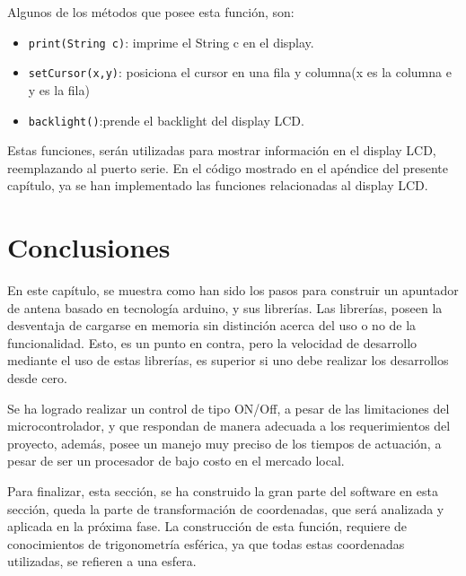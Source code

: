 Algunos de los métodos que posee esta función, son: 
\begin{itemize}
	\item \texttt{print(String c)}: imprime el String c en el display. 
	\item \texttt{setCursor(x,y)}: posiciona el cursor en una fila y columna(x es la columna e y es la fila) 
	\item \texttt{backlight()}:prende el backlight del display LCD.   
\end{itemize}

Estas funciones, serán utilizadas para mostrar información en el display LCD, reemplazando al puerto serie. En el código mostrado en el apéndice del presente capítulo, ya se han implementado las funciones relacionadas al display LCD. 


\section{Conclusiones}


En este capítulo, se muestra como han sido los pasos para construir un apuntador de antena basado en tecnología arduino, y sus librerías. Las librerías, poseen la desventaja de cargarse en memoria sin distinción acerca del uso o no de la funcionalidad. Esto, es un punto en contra, pero la velocidad de desarrollo mediante el uso de estas librerías, es superior si uno debe realizar los desarrollos desde cero.  

Se ha logrado realizar un control de tipo ON/Off, a pesar de las limitaciones del microcontrolador, y que respondan de manera adecuada a los requerimientos del proyecto, además, posee un manejo muy preciso de los tiempos de actuación, a pesar de ser un procesador de bajo costo en el mercado local. 


Para finalizar, esta sección, se ha construido la gran parte del software en esta sección, queda la parte de transformación de coordenadas, que será analizada y aplicada en la próxima fase. La construcción de esta función, requiere de conocimientos de trigonometría esférica, ya que todas estas coordenadas utilizadas, se refieren a una esfera. 



